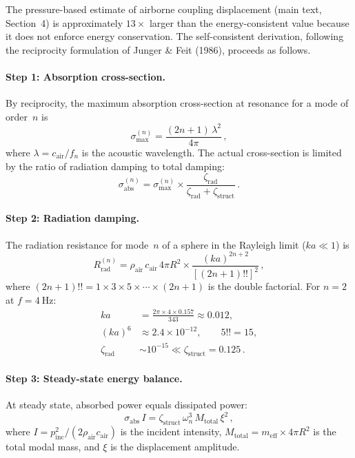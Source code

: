 \documentclass[12pt]{article}
\begin{document}
The pressure-based estimate of airborne coupling displacement
(main text, Section~4) is approximately $13\times$ larger than the
energy-consistent value because it does not enforce energy conservation.  The
self-consistent derivation, following the reciprocity formulation of
Junger \& Feit (1986),
proceeds as follows.

\paragraph{Step 1: Absorption cross-section.}
By reciprocity, the maximum absorption cross-section at resonance for a mode
of order~$n$ is
\begin{equation}
  \sigma_{\max}^{(n)} = \frac{(2n+1)\,\lambda^{2}}{4\pi} \,,
  \tag{S13}
  \label{eq:sigma_max}
\end{equation}
where $\lambda = c_{\mathrm{air}}/f_{n}$ is the acoustic wavelength.  The actual
cross-section is limited by the ratio of radiation damping to total damping:
\begin{equation}
  \sigma_{\mathrm{abs}}^{(n)} = \sigma_{\max}^{(n)}
    \times\frac{\zeta_{\mathrm{rad}}}{\zeta_{\mathrm{rad}} + \zeta_{\mathrm{struct}}} \,.
  \tag{S14}
  \label{eq:sigma_abs}
\end{equation}

\paragraph{Step 2: Radiation damping.}
The radiation resistance for mode~$n$ of a sphere in the Rayleigh limit
($ka \ll 1$) is
\begin{equation}
  R_{\mathrm{rad}}^{(n)} = \rho_{\mathrm{air}}\,c_{\mathrm{air}}\,4\pi R^{2}
    \times \frac{(ka)^{2n+2}}{[(2n+1)!!]^{2}} \,,
  \tag{S15}
\end{equation}
where $(2n+1)!! = 1\times3\times5\times\cdots\times(2n+1)$ is the double factorial.
For $n=2$ at $f = \SI{4}{\hertz}$:
\begin{align*}
  ka &= \frac{2\pi \times 4 \times 0.157}{343} \approx 0.012, \\
  (ka)^{6} &\approx 2.4\times10^{-12}, \qquad 5!! = 15, \\
  \zeta_{\mathrm{rad}} &\sim 10^{-15} \ll \zeta_{\mathrm{struct}} = 0.125 \,.
\end{align*}

\paragraph{Step 3: Steady-state energy balance.}
At steady state, absorbed power equals dissipated power:
\begin{equation}
  \sigma_{\mathrm{abs}}\,I = \zeta_{\mathrm{struct}}\,\omega_{n}^{3}\,M_{\mathrm{total}}\,\xi^{2}  \,,
  \tag{S16}
  \label{eq:energy_balance}
\end{equation}
where $I = p_{\mathrm{inc}}^{2}/(2\rho_{\mathrm{air}}c_{\mathrm{air}})$ is the
incident intensity, $M_{\mathrm{total}} = m_{\mathrm{eff}}\times 4\pi R^{2}$ is the
total modal mass, and $\xi$ is the displacement amplitude.
\end{document}
